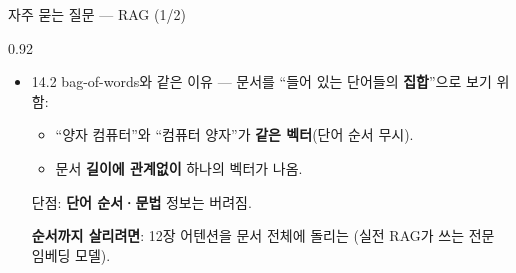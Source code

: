 \begin{frame}{자주 묻는 질문 --- RAG (1/2)}
\begin{center}\begin{varwidth}{0.92\textwidth}
  \small
  \begin{itemize}
    \item {}
      14.2 bag-of-words와 같은 이유 --- 문서를 ``들어 있는 단어들의
      \textbf{집합}''으로 보기 위함:
      \begin{itemize}
        \item ``양자 컴퓨터''와 ``컴퓨터 양자''가 \textbf{같은
          벡터}(단어 순서 무시).
        \item 문서 \textbf{길이에 관계없이} 하나의 벡터가 나옴.
      \end{itemize}
      단점: \textbf{단어 순서·문법} 정보는 버려짐.
      \par \textbf{순서까지 살리려면}: 12장 어텐션을 문서 전체에
      돌리는 (실전 RAG가 쓰는 전문 임베딩
      모델).
  \end{itemize}
\end{varwidth}\end{center}
\end{frame}

